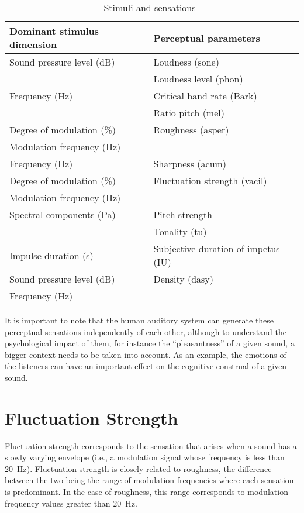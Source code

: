 \documentclass[../main.tex]{subfiles}
\begin{document}
\begin{theoreticalbackground}
\begin{table}[ht]
  \centering
  \begin{tabu} to \linewidth{ X X }
    \toprule
    \rowfont\bfseries
    Dominant stimulus dimension & Perceptual parameters \\
    \midrule
    Sound pressure level (dB) & Loudness (sone) \\
    & Loudness level (phon) \\
    \midrule
    Frequency (Hz) & Critical band rate (Bark) \\
    & Ratio pitch (mel) \\
    \midrule
    Degree of modulation (\%) & Roughness (asper)\\
    Modulation frequency (Hz) & \\
    \midrule
    Frequency (Hz) & Sharpness (acum) \\
    \midrule
    Degree of modulation (\%) & Fluctuation strength (vacil) \\
    Modulation frequency (Hz) & \\
    \midrule
    Spectral components (Pa) & Pitch strength \\
    & Tonality (tu) \\
    \midrule
    Impulse duration (s) & Subjective duration of impetus (IU) \\
    \midrule
    Sound pressure level (dB) & Density (dasy) \\
    Frequency (Hz) & \\
    \bottomrule
  \end{tabu}
  \caption{Stimuli and sensations~\cite[pp.~70]{Mueller2012Handbook}}
\label{tab:stimsens}
\end{table}

It is important to note that the human auditory system can generate these
perceptual sensations independently of each other, although to understand the
psychological impact of them, for instance the ``pleasantness'' of a given
sound, a bigger context needs to be taken into account. As an example, the
emotions of the listeners can have an important effect on the cognitive
construal of a given sound.

\section{Fluctuation Strength}

Fluctuation strength corresponds to the sensation that arises when a sound
has a slowly varying envelope (i.e., a modulation signal whose frequency is less
than 20~Hz). Fluctuation strength is closely related to roughness, the
difference between the two being the range of modulation frequencies where each
sensation is predominant. In the case of roughness, this range corresponds to
modulation frequency values greater than 20~Hz.


\end{theoreticalbackground}
\end{document}
